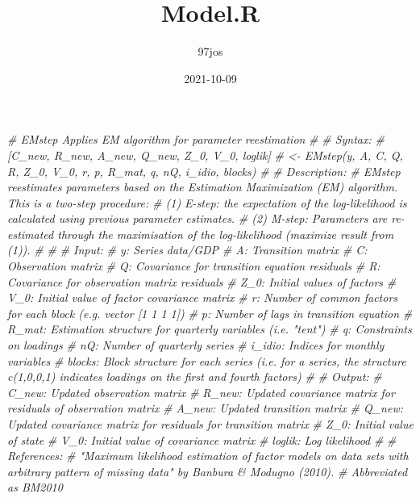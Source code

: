 \documentclass[
]{article}
\title{Model.R}
\author{97jos}
\date{2021-10-09}
\newenvironment{Shaded}{\begin{snugshade}}{\end{snugshade}}
\newcommand{\CommentTok}[1]{\textcolor[rgb]{0.56,0.35,0.01}{\textit{#1}}}
\begin{document}
\maketitle

\begin{Shaded}
\begin{Highlighting}[]
\CommentTok{\# EMstep    Applies EM algorithm for parameter reestimation}
\CommentTok{\#}
\CommentTok{\#   Syntax:}
\CommentTok{\#     [C\_new, R\_new, A\_new, Q\_new, Z\_0, V\_0, loglik]}
\CommentTok{\#       \textless{}{-} EMstep(y, A, C, Q, R, Z\_0, V\_0, r, p, R\_mat, q, nQ, i\_idio, blocks)}
\CommentTok{\#}
\CommentTok{\# Description:}
\CommentTok{\#   EMstep reestimates parameters based on the Estimation Maximization (EM) algorithm. This is a two{-}step procedure:}
\CommentTok{\#   (1) E{-}step: the expectation of the log{-}likelihood is calculated using previous parameter estimates.}
\CommentTok{\#   (2) M{-}step: Parameters are re{-}estimated through the maximisation of the log{-}likelihood (maximize result from (1)).}
\CommentTok{\#}
\CommentTok{\#}
\CommentTok{\# Input:}
\CommentTok{\#   y:      Series data/GDP}
\CommentTok{\#   A:      Transition matrix}
\CommentTok{\#   C:      Observation matrix}
\CommentTok{\#   Q:      Covariance for transition equation residuals}
\CommentTok{\#   R:      Covariance for observation matrix residuals}
\CommentTok{\#   Z\_0:    Initial values of factors}
\CommentTok{\#   V\_0:    Initial value of factor covariance matrix}
\CommentTok{\#   r:      Number of common factors for each block (e.g. vector [1 1 1 1])}
\CommentTok{\#   p:      Number of lags in transition equation}
\CommentTok{\#   R\_mat:  Estimation structure for quarterly variables (i.e. "tent")}
\CommentTok{\#   q:      Constraints on loadings}
\CommentTok{\#   nQ:     Number of quarterly series}
\CommentTok{\#   i\_idio: Indices for monthly variables}
\CommentTok{\#   blocks: Block structure for each series (i.e. for a series, the structure c(1,0,0,1) indicates loadings on the first and fourth factors)}
\CommentTok{\#}
\CommentTok{\# Output:}
\CommentTok{\#   C\_new: Updated observation matrix}
\CommentTok{\#   R\_new: Updated covariance matrix for residuals of observation matrix}
\CommentTok{\#   A\_new: Updated transition matrix}
\CommentTok{\#   Q\_new: Updated covariance matrix for residuals for transition matrix}
\CommentTok{\#   Z\_0:   Initial value of state}
\CommentTok{\#   V\_0:   Initial value of covariance matrix}
\CommentTok{\#   loglik: Log likelihood}
\CommentTok{\#}
\CommentTok{\# References:}
\CommentTok{\#   "Maximum likelihood estimation of factor models on data sets with arbitrary pattern of missing data" by Banbura \& Modugno (2010).}
\CommentTok{\#   Abbreviated as BM2010}


\end{Highlighting}
\end{Shaded}
\end{document}
